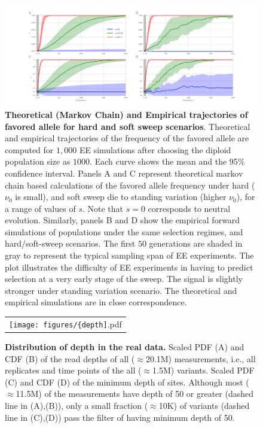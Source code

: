 \begin{figure}[H]
	\includegraphics[trim=1in 0.1in 1in 
	0.1in,clip,width=\textwidth]{figures/AF.pdf}
	\caption{{\bf Theoretical (Markov Chain) and Empirical
            trajectories of favored allele for hard and soft sweep
            scenarios}.  Theoretical and empirical trajectories of the
          frequency of the favored allele are computed for $1,000$ EE
          simulations after choosing the diploid population size as
          $1000$. Each curve shows the mean and the 95\% confidence
          interval.  Panels A and C represent theoretical markov chain
          based calculations of the favored allele frequency under
          hard ($\nu_0$ is small), and soft sweep die to standing
          variation (higher $\nu_0$), for a range of values of
          $s$. Note that $s=0$ corresponds to neutral
          evolution. Similarly, panels B and D show the empirical
          forward simulations of populations under the same selection
          regimes, and hard/soft-sweep scenarios. The first $50$
          generations are shaded in gray to represent the typical
          sampling span of EE experiments. The plot illustrates the
          difficulty of EE experiments in having to predict selection
          at a very early stage of the sweep. The signal is slightly
          stronger under standing variation scenario. The theoretical
          and empirical simulations are in close correspondence. }
	\label{fig:sweep}
\end{figure}

\begin{figure}[H]
	\centering
	\begin{tabular}{c}
		\texttt{[image: figures/\{depth]}.pdf}
	\end{tabular}
	\caption{ {\bf Distribution of depth in the real data.}
		 Scaled PDF (A) and CDF (B) of the read depths of all ($\approx$20.1M) 
		 measurements, i.e., all replicates and time points of the all 
		 ($\approx$1.5M) variants.
		 Scaled PDF (C) and CDF (D) of the minimum depth of sites. Although 
		 most ($\approx$11.5M) of the measurements have depth of 50 or greater 
		 (dashed line in (A),(B)), only a small fraction ($\approx$10K) of 
		 variants (dashed line in (C),(D)) pass the filter of having minimum 
		 depth of 50.}  
	\label{fig:depth}
\end{figure}

